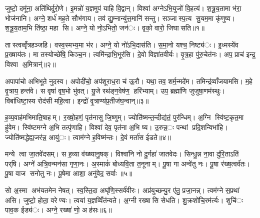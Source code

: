 


जुष्टो॒ दमू॑ना॒ अति॑थिर्दुरो॒णे। इ॒मन्नो॑ य॒ज्ञमुप॑ याहि वि॒द्वान्। विश्वा॑ अग्नेऽभि॒युजो॑ वि॒हत्य॑। श॒त्रू॒य॒तामा भ॑रा॒ भोज॑नानि। अग्ने॒ शर्ध॑ मह॒ते सौभ॑गाय। तव॑ द्यु॒म्नान्यु॑त्त॒मानि॑ सन्तु। सञ्जास्प॒त्य सु॒यम॒मा कृ॑णुष्व। श॒त्रू॒य॒ताम॒भि ति॑ष्ठा॒ महा सि। अग्ने॒ यो नो॒ऽभितो॒ जन॑ः। वृको॒ वारो॒ जिघासति॥१॥

तास्त्वव्वृँ॑त्रहञ्जहि। वस्व॒स्मभ्य॒मा भ॑र। अग्ने॒ यो नो॑ऽभि॒दास॑ति। स॒मा॒नो यश्च॒ निष्ट्य॑ः। इ॒ध्मस्ये॑व प्र॒ख्षाय॑तः। मा तस्योच्छे॑षि॒ किञ्च॒न। त्वमि॑न्द्राभि॒भूर॑सि। दे॒वो विज्ञा॑तवीर्यः। वृ॒त्र॒हा पु॑रु॒चेत॑नः। अप॒ प्राच॑ इन्द्र॒ विश्वा अ॒मित्रान्॑॥२॥

अपापा॑चो अभिभूते नुदस्व। अपोदी॑चो॒ अप॑शूराध॒रा च॑ ऊ॒रौ। यथा॒ तव॒ शर्म॒न्मदे॑म। तमिन्द्र॑व्वाँजयामसि। म॒हे वृ॒त्राय॒ हन्त॑वे। स वृषा॑ वृष॒भो भु॑वत्। यु॒जे रथ॑ङ्ग॒वेष॑ण॒ हरि॑भ्याम्। उप॒ ब्रह्मा॑णि जुजुषा॒णम॑स्थुः। विबा॑धिष्टा॒स्य रोद॑सी महि॒त्वा। इन्द्रो॑ वृ॒त्राण्य॑प्र॒तीज॑घ॒न्वान्॥३॥

ह॒व्य॒वाह॑मभिमाति॒षाहम्। र॒ख्षो॒हणं॒ पृत॑नासु जि॒ष्णुम्। ज्योति॑ष्मन्त॒न्दीद्य॑तं॒ पुर॑न्धिम्। अ॒ग्नि स्वि॑ष्ट॒कृत॒मा हु॑वेम। स्वि॑ष्टमग्ने अ॒भि तत्पृ॑णाहि। विश्वा॑ देव॒ पृत॑ना अ॒भि ष्य। उ॒रुन्न॒ः पन्थां प्रदि॒शन्विभा॑हि। ज्योति॑ष्मद्धेह्य॒जर॑न्न॒ आयु॑ः। त्वाम॑ग्ने ह॒विष्म॑न्तः। दे॒वं मर्ता॑स ईडते॥४॥

मन्ये त्वा जा॒तवे॑दसम्। स ह॒व्या व॑ख्ष्यानु॒षक्। विश्वा॑नि नो दु॒र्गहा॑ जातवेदः। सिन्धु॒न्न ना॒वा दु॑रि॒ताऽति॑ पर्‌षि। अग्ने॑ अत्रि॒वन्मन॑सा गृणा॒नः। अ॒स्माकं॑ बोध्यवि॒ता त॒नूनाम्। पू॒षा गा अन्वे॑तु नः। पू॒षा र॑ख्ष॒त्वर्व॑तः। पू॒षा वाज सनोतु नः। पू॒षेमा आशा॒ अनु॑वेद॒ सर्वाः॥५॥

सो अ॒स्मा अभ॑यतमेन नेषत्। स्व॒स्ति॒दा अघृ॑णि॒स्सर्व॑वीरः। अप्र॑युच्छन्पु॒र ए॑तु॒ प्रजा॒नन्न्। त्वम॑ग्ने स॒प्रथा॑ असि। जुष्टो॒ होता॒ वरेण्यः। त्वया॑ य॒ज्ञव्विँत॑न्वते। अ॒ग्नी रख्षासि सेधति। शु॒क्रशो॑चि॒रम॑र्त्यः। शुचि॑ः पाव॒क ईड्य॑ः। अग्ने॒ रख्षा॑ णो॒ अह॑सः॥६॥

